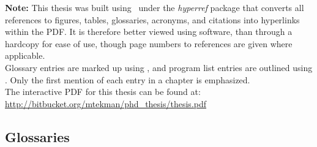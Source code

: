 \documentclass[11pt]{report} %
\begin{document}
\begin{spacing}{1.1}

\setcounter{page}{2}




{\noindent \textbf{Note:} This thesis was built using \LaTeXe\  under the \textit{hyperref} package that converts all references to figures, tables, glossaries, acronyms, and citations into hyperlinks within the PDF. It is therefore better viewed using software, than through a hardcopy for ease of use, though page numbers to references are given where applicable.}\\

{\noindent Glossary entries are marked up using {}, and program list entries are outlined using {}. Only the first mention of each entry in a chapter is emphasized.}\\

{\noindent The interactive PDF for this thesis can be found at:\\
\url{http://bitbucket.org/mtekman/phd_thesis/thesis.pdf}}




	\begin{spacing}{1.2}

	\end{spacing}

\pagebreak
	\begin{spacing}{1.2}
	\tableofcontents
	\end{spacing}
\end{spacing}

\endgroup





\pagebreak







\begin{spacing}{1}

\addtocounter{chapter}{1}
\pagebreak
{}





\appendix

\pagebreak
\chapter{Glossaries}
\printglossary[type=bio,style=long]
\pagebreak
\printglossary[type=comp,style=long]

\end{spacing}


\end{document}
